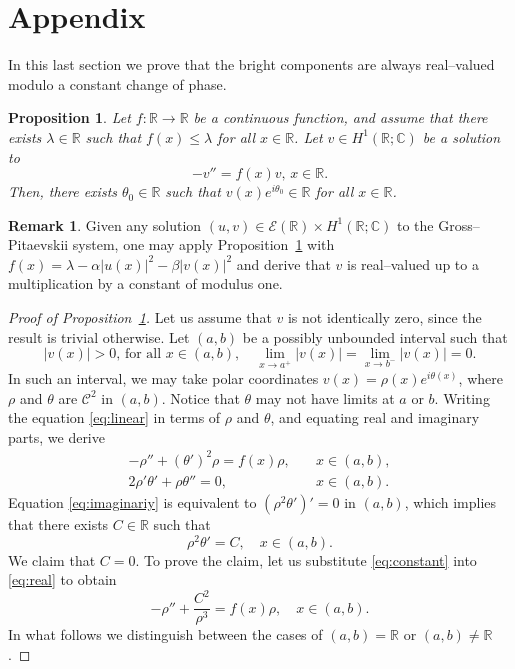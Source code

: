 \documentclass[11pt]{article}
\newcommand{\C}{\mathbb{C}}
\newcommand{\R}{\mathbb{R}}
\newcommand{\boC}{\mathcal{C}}
\newcommand{\boE}{\mathcal{E}}
\theoremstyle{plain}
\newtheorem{proposition}[theorem]{Proposition}
\theoremstyle{definition}
\newtheorem{remark}[theorem]{Remark}
\theoremstyle{remark}
\numberwithin{equation}{section}
\begin{document}
{\section*{Appendix}

In this last section we prove that the bright components are always real--valued modulo a constant change of phase.

\begin{proposition}\label{prop:realvalued}
    Let $f:\R\to\R$ be a continuous function, and assume that there exists $\lambda\in\R$ such that $f(x)\leq\lambda$ for all $x\in\R$. Let $v\in H^1(\R;\C)$ be a solution to
    \begin{equation}\label{eq:linear}
    -v''=f(x)v,\, x\in\R.
    \end{equation}
    Then, there exists $\theta_0\in\R$ such that $v(x)e^{i\theta_0}\in\R$ for all $x\in\R$.
\end{proposition}

\begin{remark}
    Given any solution $(u,v)\in \boE(\R)\times H^1(\R;\C)$ to the Gross--Pitaevskii system, one may apply Proposition~\ref{prop:realvalued} with $f(x)=\lambda-\alpha|u(x)|^2-\beta|v(x)|^2$ and derive that $v$ is real--valued up to a multiplication by a constant of modulus one. 
\end{remark}

\begin{proof}[Proof of Proposition~\ref{prop:realvalued}]
    Let us assume that $v$ is not identically zero, since the result is trivial otherwise. Let $(a,b)$ be a possibly unbounded interval such that 
    \[|v(x)|>0,\,\text{for all }x\in (a,b),\quad \lim_{x\to a^+}|v(x)|=\lim_{x\to b^-}|v(x)|=0.\]
    In such an interval, we may take polar coordinates $v(x)=\rho(x)e^{i\theta(x)}$, where $\rho$ and $\theta$ are $\boC^2$ in $(a,b)$. Notice that $\theta$ may not have limits at $a$ or $b$. Writing the equation \eqref{eq:linear} in terms of $\rho$ and $\theta$, and equating real and imaginary parts, we derive
    \begin{align}
        -\rho''+(\theta')^2\rho=f(x)\rho, \quad &x\in (a,b),\label{eq:real}
        \\
        2\rho'\theta'+\rho\theta''=0,\quad &x\in (a,b).\label{eq:imaginariy}
    \end{align}
    Equation \eqref{eq:imaginariy} is equivalent to $(\rho^2\theta')'=0$ in $(a,b)$, which implies that there exists $C\in\R$ such that 
    \begin{equation}\label{eq:constant}
    \rho^2\theta'=C,\quad x\in (a,b).
    \end{equation}
    We claim that $C=0$. To prove the claim, let us substitute \eqref{eq:constant} into \eqref{eq:real} to obtain
    \begin{equation}\label{eq:rhoC}
    -\rho''+\frac{C^2}{\rho^3}=f(x)\rho, \quad x\in (a,b).
    \end{equation}
    In what follows we distinguish between the cases of $(a,b)=\R$ or $(a,b)\not=\R$. 
    

\end{proof}}
\end{document}
